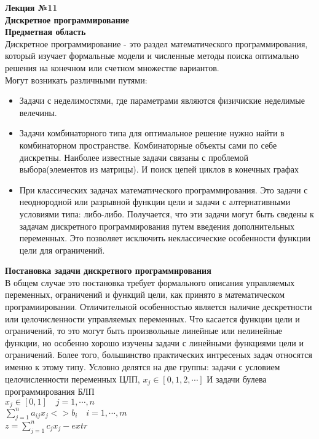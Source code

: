 \LARGE{ \textbf {Лекция №11}}\\
\Large{ \textbf {Дискретное программирование}}\\

\textbf{Предметная область}\\
Дискретное программирование - это раздел математического программирования, который изучает формальные модели
и численные методы поиска оптимально решения на конечном или счетном множестве вариантов. \\

Могут возникать различными путями:
\begin{itemize}
  \item Задачи с неделимостями, где параметрами являются физичиские неделимые велечины.
  \item Задачи комбинаторного типа для оптимальное решение нужно найти в комбинаторном пространстве.
   Комбинаторные объекты сами по себе дискретны.
   Наиболее известные задачи связаны с проблемой выбора(элементов из матрицы). И поиск цепей циклов в конечных графах
   \item При классических задачах математического программирования.
   Это задачи с неоднородной или разрывной функции цели и задачи с алтернативными условиями типа: либо-либо.
   Получается, что эти задачи могут быть сведены к задачам дискретного программирования путем введения дополнительных переменных.
   Это позволяет исключить неклассические особенности функции цели для ограничений.
\end{itemize}

\textbf{Постановка задачи дискретного программирования}\\

В общем случае это постановка требует формального описания управляемых переменных,
 ограничений и функций цели, как принято в математическом програмиировании.
Отличительной особенностью является наличие дескретности или целочисленности управляемых переменных.
Что касается функции цели и ограничений, то это могут быть произвольные линейные или нелинейные функции,
но особенно хорошо изучены задачи с линейными функциями цели и ограничений.
Более того, большинство практических интресеных  задач относятся именно к этому типу.
Условно делятся на две группы: задачи с условием целочисленности переменных ЦЛП, $x_j \in [0,1,2, \cdots]$
И задачи булева программирования БЛП  \\
$x_j \in [0,1] \quad j = 1, \cdots , n$\\
$ \sum \limits_{j =1}^n a_{ij}x_j <> b_i \quad i = 1, \cdots , m$\\
$z = \sum \limits_{j =1}^n c_j x_j - extr $\\

